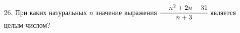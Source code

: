 26. При каких натуральных $n$ значение выражения $\cfrac{-n^2+2n-31}{n+3}$ является целым числом?\\
